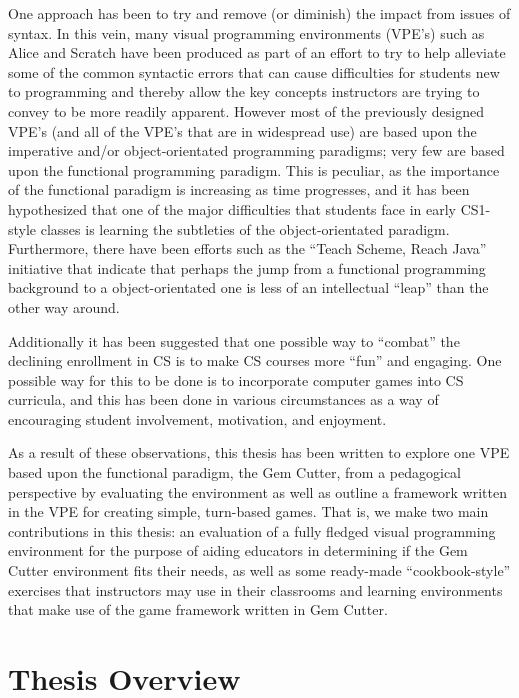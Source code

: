 One approach has been to try and remove (or diminish) the impact from issues of syntax.  In this vein, many visual programming environments (VPE's) such as Alice\cite{alice} and Scratch\cite{scratch} have been produced as part of an effort to try to help alleviate some of the common syntactic errors that can cause difficulties for students new to programming and thereby allow the key concepts instructors are trying to convey to be more readily apparent.  However most of the previously designed VPE's (and all of the VPE's that are in widespread use) are based upon the imperative and/or object-orientated programming paradigms; very few are based upon the functional programming paradigm.  This is peculiar, as the importance of the functional paradigm is increasing as time progresses, and it has been hypothesized that one of the major difficulties that students face in early CS1-style classes is learning the subtleties of the object-orientated paradigm\cite{Manaris07,Mahmoud04,Benander04}. Furthermore, there have been efforts such as the ``Teach Scheme, Reach Java'' initiative \cite{Bloch08} that indicate that perhaps the jump from a functional programming background to a object-orientated one is less of an intellectual ``leap'' than the other way around\cite{Huch05}.

Additionally it has been suggested that one possible way to ``combat'' the declining enrollment in CS is to make CS courses more ``fun'' and engaging\cite{Carter06}.  One possible way for this to be done is to incorporate computer games into CS curricula, and this has been done in various circumstances as a way of encouraging student involvement, motivation, and enjoyment\cite{Barnes08,Gooch08,Curtis05,Overmars05,Sweedyk05}.

As a result of these observations, this thesis has been written to explore one VPE based upon the functional paradigm, the Gem Cutter, from a pedagogical perspective by evaluating the environment as well as outline a framework written in the VPE for creating simple, turn-based games.  That is, we make two main contributions in this thesis: an evaluation of a fully fledged visual programming environment for the purpose of aiding educators in determining if the Gem Cutter environment fits their needs, as well as some ready-made ``cookbook-style'' exercises that instructors may use in their classrooms and learning environments that make use of the game framework written in Gem Cutter.

\section{Thesis Overview}

